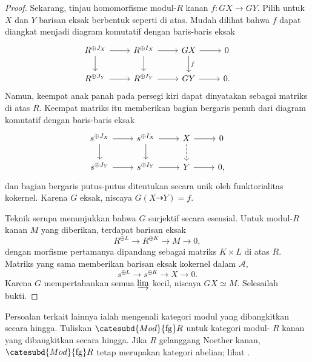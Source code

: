 \begin{proof}
	Sekarang, tinjau homomorfisme modul-$R$ kanan $f:GX\to GY$. Pilih untuk
	$X$ dan $Y$ barisan eksak berbentuk seperti di atas. Mudah dilihat bahwa
	$f$ dapat diangkat menjadi diagram komutatif dengan baris-baris eksak
	\[\begin{tikzcd}
		R^{\oplus J_X} \arrow[r] \arrow[d] & R^{\oplus I_X} \arrow[d] \arrow[r] & GX \arrow[d, "f"] \arrow[r] & 0 \\
		R^{\oplus J_Y} \arrow[r] & R^{\oplus I_Y} \arrow[r] & GY \arrow[r] & 0.
	\end{tikzcd}\]
	Namun, keempat anak panah pada persegi kiri dapat dinyatakan sebagai
	matriks di atas $R$. Keempat matriks itu memberikan bagian bergaris penuh
	dari diagram komutatif dengan baris-baris eksak
	\[\begin{tikzcd}
		s^{\oplus J_X} \arrow[r] \arrow[d] & s^{\oplus I_X} \arrow[d] \arrow[r] & X \arrow[dashed, d] \arrow[r] & 0 \\
		s^{\oplus J_Y} \arrow[r] & s^{\oplus I_Y} \arrow[r] & Y \arrow[r] & 0,
	\end{tikzcd}\]
	dan bagian bergaris putus-putus ditentukan secara unik oleh funktorialitas
	kokernel. Karena $G$ eksak, niscaya $G(X\dashrightarrow Y)=f$.

	Teknik serupa menunjukkan bahwa $G$ surjektif secara esensial. Untuk modul-$R$
	kanan $M$ yang diberikan, terdapat barisan eksak
	\[ R^{\oplus L} \to R^{\oplus K} \to M \to 0, \]
	dengan morfisme pertamanya dipandang sebagai matriks $K\times L$ di atas
	$R$. Matriks yang sama memberikan barisan eksak kokernel dalam
	$\mathcal{A}$,
	\[ s^{\oplus L} \to s^{\oplus K} \to X \to 0. \]
	Karena $G$ mempertahankan semua $\varinjlim$ kecil, niscaya
	$GX\simeq M$. Selesailah bukti.
\end{proof}

Persoalan terkait lainnya ialah mengenali kategori modul yang dibangkitkan
secara hingga. Tuliskan $\catesubd{Mod}{\mathrm{fg}}R$ untuk kategori modul-
$R$ kanan yang dibangkitkan secara hingga. Jika $R$ gelanggang Noether kanan,
$\catesubd{Mod}{\mathrm{fg}}R$ tetap merupakan kategori abelian; lihat
\cite[Proposisi 6.10.3, Lema 6.10.4]{Li1}.

